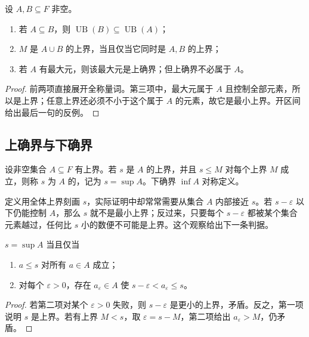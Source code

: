 \begin{proposition}
设 \(A,B\subseteq F\) 非空。
\begin{enumerate}
 \item 若 \(A\subseteq B\)，则 \(\operatorname{UB}(B)\subseteq\operatorname{UB}(A)\)；
 \item \(M\) 是 \(A\cup B\) 的上界，当且仅当它同时是 \(A,B\) 的上界；
 \item 若 \(A\) 有最大元，则该最大元是上确界；但上确界不必属于 \(A\)。
\end{enumerate}
\end{proposition}

\begin{proof}
前两项直接展开全称量词。第三项中，最大元属于 \(A\) 且控制全部元素，所以是上界；任意上界还必须不小于这个属于 \(A\) 的元素，故它是最小上界。开区间给出最后一句的反例。
\end{proof}

\subsection{上确界与下确界}


\begin{definition}
设非空集合 \(A\subseteq F\) 有上界。若 \(s\) 是 \(A\) 的上界，并且 \(s\le M\) 对每个上界 \(M\) 成立，则称 \(s\) 为 \(A\) 的，记为 \(s=\sup A\)。下确界 \(\inf A\) 对称定义。
\end{definition}

定义用全体上界刻画 \(s\)，实际证明中却常常需要从集合 \(A\) 内部接近 \(s\)。若 \(s-\varepsilon\) 以下仍能控制 \(A\)，那么 \(s\) 就不是最小上界；反过来，只要每个 \(s-\varepsilon\) 都被某个集合元素越过，任何比 \(s\) 小的数便不可能是上界。这个观察给出下一条判据。

\begin{theorem}[上确界的近似刻画]
\(s=\sup A\) 当且仅当
\begin{enumerate}
 \item \(a\le s\) 对所有 \(a\in A\) 成立；
 \item 对每个 \(\varepsilon>0\)，存在 \(a_\varepsilon\in A\) 使 \(s-\varepsilon<a_\varepsilon\le s\)。
\end{enumerate}
\end{theorem}

\begin{proof}
若第二项对某个 \(\varepsilon>0\) 失败，则 \(s-\varepsilon\) 是更小的上界，矛盾。反之，第一项说明 \(s\) 是上界。若有上界 \(M<s\)，取 \(\varepsilon=s-M\)，第二项给出 \(a_\varepsilon>M\)，仍矛盾。
\end{proof}

